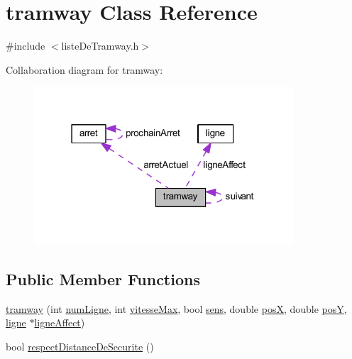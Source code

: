 \hypertarget{classtramway}{}\section{tramway Class Reference}
\label{classtramway}


{\ttfamily \#include $<$liste\+De\+Tramway.\+h$>$}



Collaboration diagram for tramway\+:
\nopagebreak
\begin{figure}[H]
\begin{center}
\leavevmode
\includegraphics[width=274pt]{classtramway__coll__graph}
\end{center}
\end{figure}
\subsection*{Public Member Functions}
\begin{DoxyCompactItemize}
\item 
\hyperlink{classtramway_a3f1e91b979ea3309cd93208439fb5a10}{tramway} (int \hyperlink{classtramway_a937d549fcbdbe222ea08e4ec085bb19b}{num\+Ligne}, int \hyperlink{classtramway_a401f568b9c8cedcf0c359eb68ea8865d}{vitesse\+Max}, bool \hyperlink{classtramway_abc99be632a1ef40a7eae8bb46ac364f6}{sens}, double \hyperlink{classtramway_a0ba5b158240fe160ee8b91c74b4010f5}{posX}, double \hyperlink{classtramway_afb1214281e7e1b2c9a9fd9a5d322e836}{posY}, \hyperlink{classligne}{ligne} $\ast$\hyperlink{classtramway_a0506569903981a08b8835a73fc49609b}{ligne\+Affect})
\item 
bool \hyperlink{classtramway_ac11a2d8761217b5db1253cc35ea67a66}{respect\+Distance\+De\+Securite} ()
\end{DoxyCompactItemize}
